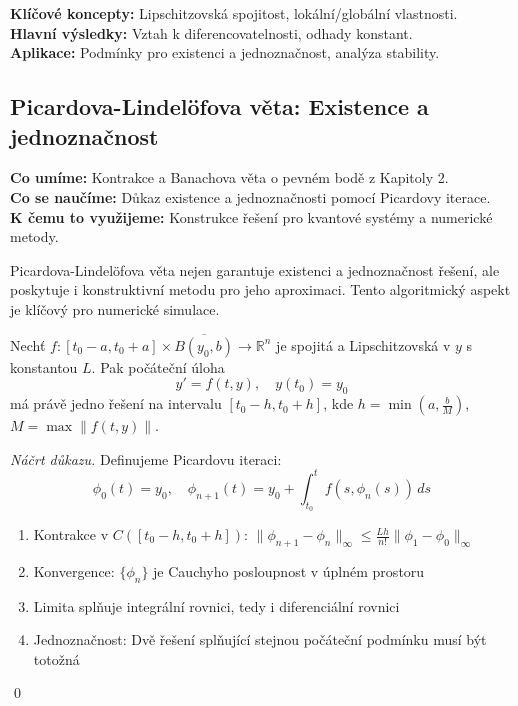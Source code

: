 \begin{summary}
\textbf{Klíčové koncepty:} Lipschitzovská spojitost, lokální/globální vlastnosti. \\
\textbf{Hlavní výsledky:} Vztah k diferencovatelnosti, odhady konstant. \\
\textbf{Aplikace:} Podmínky pro existenci a jednoznačnost, analýza stability.
\end{summary}

\spc

\subsection{Picardova-Lindelöfova věta: Existence a jednoznačnost}

\begin{scaffold}
\textbf{Co umíme:} Kontrakce a Banachova věta o pevném bodě z Kapitoly 2. \\
\textbf{Co se naučíme:} Důkaz existence a jednoznačnosti pomocí Picardovy iterace. \\
\textbf{K čemu to využijeme:} Konstrukce řešení pro kvantové systémy a numerické metody.
\end{scaffold}

\begin{motivation}
Picardova-Lindelöfova věta nejen garantuje existenci a jednoznačnost řešení, ale poskytuje i konstruktivní metodu pro jeho aproximaci. Tento algoritmický aspekt je klíčový pro numerické simulace.
\end{motivation}

\begin{theorem}
Nechť $f: [t_0-a, t_0+a] \times \overline{B(y_0,b)} \to \mathbb{R}^n$ je spojitá a Lipschitzovská v $y$ s konstantou $L$. Pak počáteční úloha
\[
y' = f(t,y), \quad y(t_0) = y_0
\]
má právě jedno řešení na intervalu $[t_0-h, t_0+h]$, kde $h = \min\left(a, \frac{b}{M}\right)$, $M = \max\|f(t,y)\|$.
\end{theorem}

\begin{proof}[Náčrt důkazu]
Definujeme Picardovu iteraci:
\[
\phi_0(t) = y_0, \quad \phi_{n+1}(t) = y_0 + \int_{t_0}^t f(s, \phi_n(s))\, ds
\]
\begin{enumerate}
\item Kontrakce v $C([t_0-h, t_0+h])$: $\|\phi_{n+1} - \phi_n\|_\infty \leq \frac{Lh}{n!}\|\phi_1 - \phi_0\|_\infty$
\item Konvergence: $\{\phi_n\}$ je Cauchyho posloupnost v úplném prostoru
\item Limita splňuje integrální rovnici, tedy i diferenciální rovnici
\item Jednoznačnost: Dvě řešení splňující stejnou počáteční podmínku musí být totožná
\end{enumerate}
\qed
\end{proof}

